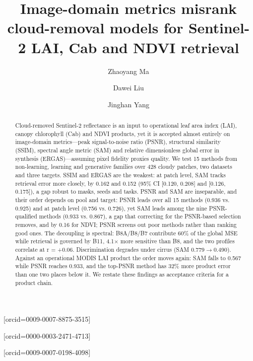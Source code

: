 \documentclass[a4paper,fleqn]{cas-dc}
\begin{document}
\let\WriteBookmarks\relax
\def\floatpagepagefraction{1}
\def\textpagefraction{.001}


\title[mode=title]{Image-domain metrics misrank cloud-removal models for Sentinel-2 LAI, Cab and NDVI retrieval}

\author[1]{Zhaoyang Ma}[orcid=0009-0007-8875-3515]

\author[1]{Dawei Liu}[orcid=0000-0003-2471-4713]
\cormark[1]

\author[1]{Jinghan Yang}[orcid=0009-0007-0198-4098]



\begin{abstract}
Cloud-removed Sentinel-2 reflectance is an input to operational leaf area index (LAI), canopy chlorophyll (Cab) and NDVI products, yet it is accepted almost entirely on image-domain metrics---peak signal-to-noise ratio (PSNR), structural similarity (SSIM), spectral angle metric (SAM) and relative dimensionless global error in synthesis (ERGAS)---assuming pixel fidelity proxies quality. We test 15 methods from non-learning, learning and generative families over 428 cloudy patches, two datasets and three targets. SSIM and ERGAS are the weakest: at patch level, SAM tracks retrieval error more closely, by 0.162 and 0.152 (95\% CI [0.120, 0.208] and [0.126, 0.175]), a gap robust to masks, seeds and tasks. PSNR and SAM are inseparable, and their order depends on pool and target: PSNR leads over all 15 methods (0.936 vs. 0.925) and at patch level (0.756 vs. 0.726), yet SAM leads among the nine PSNR-qualified methods (0.933 vs. 0.867), a gap that correcting for the PSNR-based selection removes, and by 0.16 for NDVI; PSNR screens out poor methods rather than ranking good ones. The decoupling is spectral: B8A/B8/B7 contribute 60\% of the global MSE while retrieval is governed by B11, 4.1$\times$ more sensitive than B8, and the two profiles correlate at r = +0.06. Discrimination degrades under cirrus (SAM 0.779$\rightarrow$0.490). Against an operational MODIS LAI product the order moves again: SAM falls to 0.567 while PSNR reaches 0.933, and the top-PSNR method has 32\% more product error than one two places below it. We restate these findings as acceptance criteria for a product chain.
\end{abstract}
\end{document}
